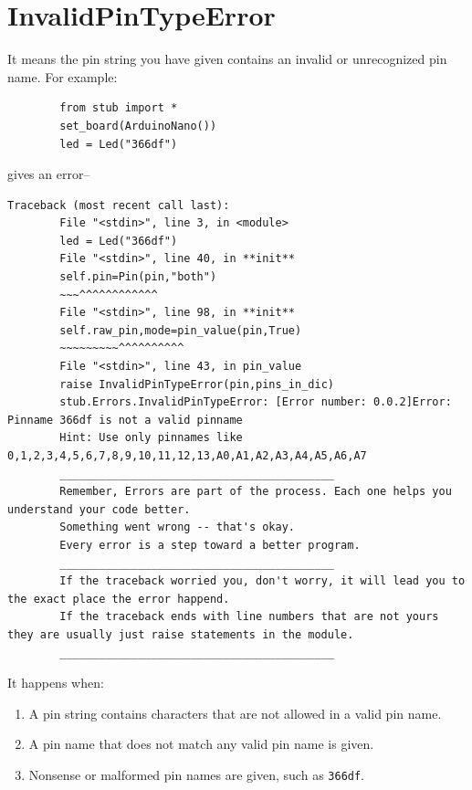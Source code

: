 	\section{InvalidPinTypeError} 
	\label{sec:pintyperror}
	It means the pin string you have given contains an invalid or unrecognized pin name. For example: 
	\begin{lstlisting} 
		from stub import * 
		set_board(ArduinoNano()) 
		led = Led("366df") 
	\end{lstlisting} 
	gives an error-- 
	\begin{lstlisting}[style=tracebacks] 
		Traceback (most recent call last): 
		File "<stdin>", line 3, in <module> 
		led = Led("366df") 
		File "<stdin>", line 40, in **init** 
		self.pin=Pin(pin,"both") 
		~~~^^^^^^^^^^^^ 
		File "<stdin>", line 98, in **init** 
		self.raw_pin,mode=pin_value(pin,True) 
		~~~~~~~~~^^^^^^^^^^ 
		File "<stdin>", line 43, in pin_value 
		raise InvalidPinTypeError(pin,pins_in_dic) 
		stub.Errors.InvalidPinTypeError: [Error number: 0.0.2]Error: Pinname 366df is not a valid pinname 
		Hint: Use only pinnames like 0,1,2,3,4,5,6,7,8,9,10,11,12,13,A0,A1,A2,A3,A4,A5,A6,A7 
		__________________________________________ 
		Remember, Errors are part of the process. Each one helps you understand your code better. 
		Something went wrong -- that's okay. 
		Every error is a step toward a better program. 
		__________________________________________ 
		If the traceback worried you, don't worry, it will lead you to the exact place the error happend. 
		If the traceback ends with line numbers that are not yours they are usually just raise statements in the module. 
		__________________________________________ 
	\end{lstlisting} 
	
	
	It happens when: 
	\begin{enumerate} 
		\item A pin string contains characters that are not allowed in a valid pin name. 
		\item A pin name that does not match any valid pin name is given. 
		\item Nonsense or malformed pin names are given, such as \texttt{366df}. 
	\end{enumerate} 
	\newpage 
	
